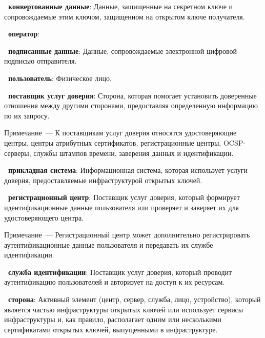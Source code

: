 {\bf \thedefctr~конвертованные данные}:
Данные, защищенные на секретном ключе и сопровождаемые этим ключом, 
защищенном на открытом ключе получателя.  

{\bf \thedefctr~оператор}:

{\bf \thedefctr~подписанные данные}:
Данные, сопровождаемые электронной цифровой подписью отправителя. 

{\bf\thedefctr~пользователь}: 
Физическое лицо.

{\bf\thedefctr~поставщик услуг доверия}:
Сторона, которая помогает установить доверенные отношения между другими 
сторонами, предоставляя определенную информацию по их запросу.

\begin{note}
Примечание~--- К поставщикам услуг доверия относятся удостоверяющие 
центры, центры атрибутных сертификатов, регистрационные центры, 
OCSP-серверы, службы штампов времени, заверения данных и идентификации.
\end{note}

{\bf\thedefctr~прикладная система}:
Информационная система, которая использует услуги доверия,
предоставляемые инфраструктурой открытых ключей.
%

{\bf\thedefctr~регистрационный центр}: 
Поставщик услуг доверия, который формирует идентификационные данные 
пользователя или проверяет и заверяет их для удостоверяющего центра.

\begin{note}
Примечание~--- Регистрационный центр может дополнительно регистрировать 
аутентификационные данные пользователя и передавать их службе 
идентификации.
\end{note}

{\bf\thedefctr~служба идентификации}: 
Поставщик услуг доверия, который проводит аутентификацию 
пользователей и авторизует на доступ к их ресурсам.
%

{\bf\thedefctr~сторона}: 
Активный элемент (центр, сервер, служба, лицо, устройство), который является 
частью инфраструктуры открытых ключей или использует сервисы 
инфраструктуры и, как правило, располагает одним или несколькими 
сертификатами открытых ключей, выпущенными в инфраструктуре.

